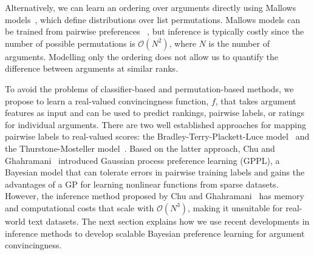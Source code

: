 Alternatively, we can learn an ordering over arguments directly using Mallows models~\cite{mallows1957non},
which define distributions over list permutations.  
Mallows models can be trained from pairwise preferences 
~\cite{lu2011learning}, but inference is typically costly
since the number of possible permutations is $\mathcal{O}(N^2)$, 
where $N$ is the number of arguments. 
Modelling only the ordering does not allow us to quantify 
the difference between arguments at similar ranks.

To avoid the problems of classifier-based and permutation-based methods, 
we propose to learn a real-valued convincingness function, $f$, that takes argument features as input
and can be used to predict rankings, pairwise labels, or ratings for individual arguments.
There are two well established approaches for mapping pairwise labels to real-valued scores: 
the Bradley-Terry-Plackett-Luce model~\cite{bradley1952rank,luce1959possible,plackett1975analysis}
and the Thurstone-Mosteller model~\cite{thurstone1927law,mosteller2006remarks}.
Based on the latter approach, 
Chu and Ghahramani~ introduced 
Gaussian process preference learning (GPPL), 
a Bayesian model that can tolerate errors in pairwise training labels
and gains the advantages of a GP for learning nonlinear functions from sparse datasets.
However, the inference method proposed by Chu and Ghahramani~ 
has memory and computational costs that scale with $\mathcal{O}(N^3)$,
making it unsuitable for real-world text datasets. 
The next section explains how we use recent developments in inference methods 
to develop scalable Bayesian preference learning for argument convincingness.

